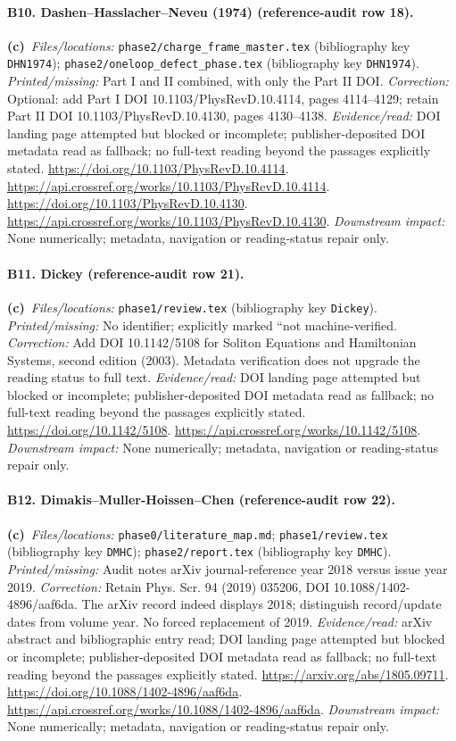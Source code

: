 \documentclass[11pt,a4paper]{article}
\newcommand{\C}{\textbf{(c)}\ }
\newcommand{\file}[1]{\nolinkurl{#1}}
\begin{document}
\paragraph{B10. Dashen--Hasslacher--Neveu (1974) (reference-audit row 18).}
\C \textit{Files/locations:} \file{phase2/charge_frame_master.tex} (bibliography key \file{DHN1974}); \file{phase2/oneloop_defect_phase.tex} (bibliography key \file{DHN1974}).
\textit{Printed/missing:} Part I and II combined, with only the Part II DOI.
\textit{Correction:} Optional: add Part I DOI 10.1103/PhysRevD.10.4114, pages 4114--4129; retain Part II DOI 10.1103/PhysRevD.10.4130, pages 4130--4138.
\textit{Evidence/read:} DOI landing page attempted but blocked or incomplete; publisher-deposited DOI metadata read as fallback; no full-text reading beyond the passages explicitly stated.
\url{https://doi.org/10.1103/PhysRevD.10.4114}.
\url{https://api.crossref.org/works/10.1103/PhysRevD.10.4114}.
\url{https://doi.org/10.1103/PhysRevD.10.4130}.
\url{https://api.crossref.org/works/10.1103/PhysRevD.10.4130}.
\textit{Downstream impact:} None numerically; metadata, navigation or reading-status repair only.
\paragraph{B11. Dickey (reference-audit row 21).}
\C \textit{Files/locations:} \file{phase1/review.tex} (bibliography key \file{Dickey}).
\textit{Printed/missing:} No identifier; explicitly marked ``not machine-verified.
\textit{Correction:} Add DOI 10.1142/5108 for Soliton Equations and Hamiltonian Systems, second edition (2003). Metadata verification does not upgrade the reading status to full text.
\textit{Evidence/read:} DOI landing page attempted but blocked or incomplete; publisher-deposited DOI metadata read as fallback; no full-text reading beyond the passages explicitly stated.
\url{https://doi.org/10.1142/5108}.
\url{https://api.crossref.org/works/10.1142/5108}.
\textit{Downstream impact:} None numerically; metadata, navigation or reading-status repair only.
\paragraph{B12. Dimakis--Muller-Hoissen--Chen (reference-audit row 22).}
\C \textit{Files/locations:} \file{phase0/literature_map.md}; \file{phase1/review.tex} (bibliography key \file{DMHC}); \file{phase2/report.tex} (bibliography key \file{DMHC}).
\textit{Printed/missing:} Audit notes arXiv journal-reference year 2018 versus issue year 2019.
\textit{Correction:} Retain Phys. Scr. 94 (2019) 035206, DOI 10.1088/1402-4896/aaf6da. The arXiv record indeed displays 2018; distinguish record/update dates from volume year. No forced replacement of 2019.
\textit{Evidence/read:} arXiv abstract and bibliographic entry read; DOI landing page attempted but blocked or incomplete; publisher-deposited DOI metadata read as fallback; no full-text reading beyond the passages explicitly stated.
\url{https://arxiv.org/abs/1805.09711}.
\url{https://doi.org/10.1088/1402-4896/aaf6da}.
\url{https://api.crossref.org/works/10.1088/1402-4896/aaf6da}.
\textit{Downstream impact:} None numerically; metadata, navigation or reading-status repair only.
\end{document}
